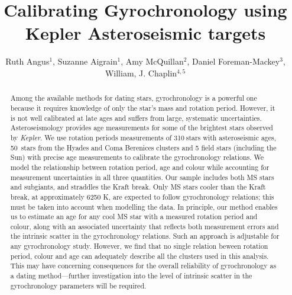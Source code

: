 \documentclass[10pt,preprint]{aastex}
\newcommand{\nastero}{310}
\newcommand{\nHC}{50~}
\begin{document}
\title{Calibrating Gyrochronology using Kepler Asteroseismic targets}

\author{Ruth Angus$^1$, Suzanne Aigrain$^1$, Amy McQuillan$^2$, Daniel Foreman-Mackey$^3$,  William, J. Chaplin$^{4, 5}$}

\begin{abstract}
\label{abs}

Among the available methods for dating stars, gyrochronology is a powerful one because it requires knowledge of only the star's mass and rotation period.
However, it is not well calibrated at late ages and suffers from large, systematic uncertainties.
Asteroseismology provides age measurements for some of the brightest stars observed by {\it Kepler}.
We use rotation periods measurements of \nastero$~$stars with asteroseismic ages, \nHC stars from the Hyades and Coma Berenices clusters and 5 field stars (including the Sun) with precise age measurements to calibrate the gyrochronology relations.
We model the relationship between rotation period, age and colour while accounting for measurement uncertainties in all three quantities.
Our sample includes both MS stars and subgiants, and straddles the Kraft break.
Only MS stars cooler than the Kraft break, at approximately 6250 K, are expected to follow gyrochronology relations; this must be taken into account when modelling the data.
In principle, our method enables us to estimate an age for any cool MS star with a measured rotation period and colour, along with an associated uncertainty that reflects both measurement errors and the intrinsic scatter in the gyrochronology relations.
Such an approach is adjustable for any gyrochronology study.
However, we find that no single relation beween rotation period, colour and age can adequately describe all the clusters used in this analysis.
This may have concerning consequences for the overall reliability of gyrochronology as a dating method---further investigation into the level of intrinsic scatter in the gyrochronology parameters will be required.

\end{abstract}
\end{document}
